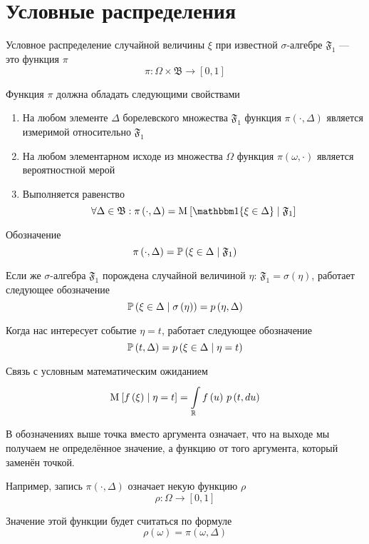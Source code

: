 \section{Условные распределения}

\begin{definition}
    Условное распределение случайной величины $\xi$
    при известной $\sigma$-алгебре $\mathfrak{F}_1$ --- это функция $\pi$
    $$\pi: \Omega \times \mathfrak{B} \rightarrow \left[ 0, 1 \right]$$
    
    Функция $\pi$ должна обладать следующими свойствами
    \begin{enumerate}
        \item На любом элементе $\Delta$ борелевского множества $\mathfrak{F}_1$
            функция $\pi\left( \cdot, \Delta \right)$ является измеримой
            относительно $\mathfrak{F}_1$
        \item На любом элементарном исходе из множества $\Omega$
            функция $\pi\left( \omega, \cdot \right)$
            является вероятностной мерой
        \item Выполняется равенство
            $$\forall \Delta \in \mathfrak{B}: \pi\left( \cdot, \Delta \right)
                = \Mean{\Indicator{\xi \in \Delta} \mcond \mathfrak{F}_1}$$
    \end{enumerate}

    Обозначение
    $$\pi\left( \cdot, \Delta \right)
        = \probability{\xi \in \Delta \mcond \mathfrak{F}_1}$$

    Если же $\sigma$-алгебра $\mathfrak{F}_1$ порождена
    случайной величиной $\eta$: $\mathfrak{F}_1 = \sigma\left( \eta \right)$,
    работает следующее обозначение
    $$\probability{\xi \in \Delta \mcond \sigma\left( \eta \right)}
        = \pdf{\eta, \Delta}$$

    Когда нас интересует событие $\eta = t$, работает следующее обозначение
    $$\probability{t, \Delta} = \pdf{\xi \in \Delta \mcond \eta = t}$$

    Связь с условным математическим ожиданием
    $$\Mean{f\left( \xi \right) \mcond \eta = t}
        = \integrall{\mathbb{R}}{\pdf{t, du}}{f\left( u \right)}$$
\end{definition}

\begin{remark}
    В обозначениях выше точка вместо аргумента означает,
    что на выходе мы получаем не определённое значение,
    а функцию от того аргумента, который заменён точкой.

    Например, запись $\pi\left( \cdot, \Delta \right)$
    означает некую функцию $\rho$
        $$\rho: \Omega \rightarrow \left[ 0, 1 \right]$$

    Значение этой функции будет считаться по формуле
        $$\rho\left( \omega \right) = \pi\left( \omega, \Delta \right)$$
\end{remark}

